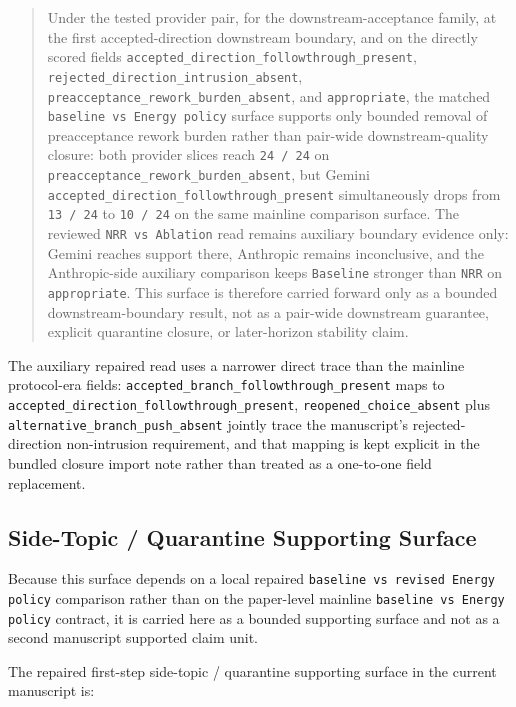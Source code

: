 \documentclass[11pt]{article}
\begin{document}
\begin{quote}
Under the tested provider pair, for the downstream-acceptance family, at the
first accepted-direction downstream boundary, and on the directly scored fields
\texttt{accepted\_direction\_followthrough\_present},
\texttt{rejected\_direction\_intrusion\_absent},
\texttt{preacceptance\_rework\_burden\_absent}, and \texttt{appropriate}, the
matched \texttt{baseline vs Energy policy} surface supports only bounded
removal of preacceptance rework burden rather than pair-wide downstream-quality
closure: both provider slices reach \texttt{24 / 24} on
\texttt{preacceptance\_rework\_burden\_absent}, but Gemini
\texttt{accepted\_direction\_followthrough\_present} simultaneously drops from
\texttt{13 / 24} to \texttt{10 / 24} on the same mainline comparison surface.
The
reviewed \texttt{NRR vs Ablation} read remains auxiliary boundary evidence
only: Gemini reaches support there, Anthropic remains inconclusive, and the
Anthropic-side auxiliary comparison keeps \texttt{Baseline} stronger than
\texttt{NRR} on \texttt{appropriate}. This surface is therefore carried forward
only as a bounded downstream-boundary result, not as a pair-wide downstream
guarantee, explicit quarantine closure, or later-horizon stability claim.
\end{quote}

The auxiliary repaired read uses a narrower direct trace than the mainline
protocol-era fields: \texttt{accepted\_branch\_followthrough\_present} maps to
\texttt{accepted\_direction\_followthrough\_present},
\texttt{reopened\_choice\_absent} plus
\texttt{alternative\_branch\_push\_absent} jointly trace the manuscript's
rejected-direction non-intrusion requirement, and that mapping is kept explicit
in the bundled closure import note rather than treated as a one-to-one field
replacement.

\subsection{Side-Topic / Quarantine Supporting Surface}

Because this surface depends on a local repaired
\texttt{baseline vs revised Energy policy} comparison rather than on the
paper-level mainline \texttt{baseline vs Energy policy} contract, it is carried
here as a bounded supporting surface and not as a second manuscript supported
claim unit.

The repaired first-step side-topic / quarantine supporting surface in the
current manuscript is:
\end{document}
